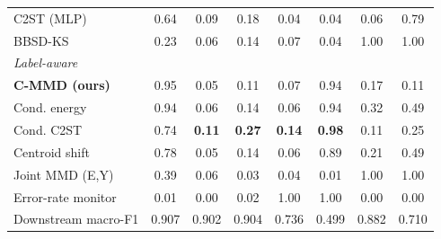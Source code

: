 \begin{tabular}{lccccccc}
C2ST (MLP) & 0.64 & 0.09 & 0.18 & 0.04 & 0.04 & 0.06 & 0.79 \\
BBSD-KS & 0.23 & 0.06 & 0.14 & 0.07 & 0.04 & 1.00 & 1.00 \\
\multicolumn{8}{l}{\textit{Label-aware}} \\
\textbf{C-MMD (ours)} & 0.95 & 0.05 & 0.11 & 0.07 & 0.94 & 0.17 & 0.11 \\
Cond. energy & 0.94 & 0.06 & 0.14 & 0.06 & 0.94 & 0.32 & 0.49 \\
Cond. C2ST & 0.74 & \textbf{0.11} & \textbf{0.27} & \textbf{0.14} & \textbf{0.98} & 0.11 & 0.25 \\
Centroid shift & 0.78 & 0.05 & 0.14 & 0.06 & 0.89 & 0.21 & 0.49 \\
Joint MMD (E,Y) & 0.39 & 0.06 & 0.03 & 0.04 & 0.01 & 1.00 & 1.00 \\
Error-rate monitor & 0.01 & 0.00 & 0.02 & 1.00 & 1.00 & 0.00 & 0.00 \\
\midrule
Downstream macro-F1 & 0.907 & 0.902 & 0.904 & 0.736 & 0.499 & 0.882 & 0.710 \\
\bottomrule
\end{tabular}